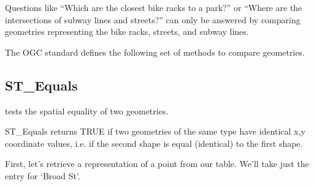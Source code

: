\documentclass[a4paper,11pt,english]{sphinxmanual}
\begin{document}
Questions like “Which are the closest bike racks to a park?” or “Where are the intersections of subway lines and streets?” can only be answered by comparing geometries representing the bike racks, streets, and subway lines.

The OGC standard defines the following set of methods to compare geometries.


\subsection{ST\_Equals}
\label{\detokenize{basic:st-equals}}
 tests the spatial equality of two geometries.

\begin{figure}[htbp]
\centering

\noindent{}
\end{figure}

ST\_Equals returns TRUE if two geometries of the same type have identical x,y coordinate values, i.e. if the second shape is equal (identical) to the first shape.

First, let’s retrieve a representation of a point from our  table. We’ll take just the entry for ‘Broad St’.

\begin{sphinxVerbatim}[commandchars=\\\{\}]
   
 
   
\end{sphinxVerbatim}
\end{document}
